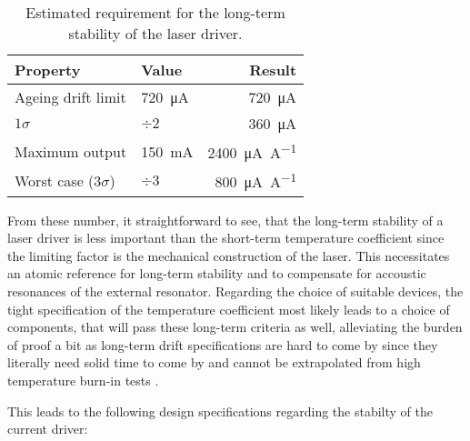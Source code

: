 \begin{table}[hb]
    \centering
    \begin{tabular}{llr}
        Property& Value& Result \\
        \midrule
        Ageing drift limit & \qty{720}{\uA}& \qty{720}{\uA}\\
        $1 \sigma$  & $\div 2$& \qty{360}{\uA} \\
        Maximum output& \qty{150}{\mA}& \qty{2400}{\uA \per \A}\\
        Worst case ($3 \sigma$)& $\div 3$& \qty{800}{\uA \per \A}\\
    \end{tabular}
    \caption{Estimated requirement for the long-term stability of the laser driver.}
    \label{tab:dgdrive_stability}
\end{table}

From these number, it straightforward to see, that the long-term stability of a laser driver is less important than the short-term temperature coefficient since the limiting factor is the mechanical construction of the laser. This necessitates an atomic reference for long-term stability and to compensate for accoustic resonances of the external resonator. Regarding the choice of suitable devices, the tight specification of the temperature coefficient most likely leads to a choice of components, that will pass these long-term criteria as well, alleviating the burden of proof a bit as long-term drift specifications are hard to come by since they literally need solid time to come by and cannot be extrapolated from high temperature burn-in tests \cite{voltage_reference_drift}.


This leads to the following design specifications regarding the stabilty of the current driver:

